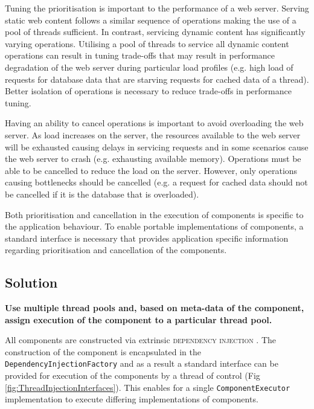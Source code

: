 \documentclass[prodmode]{style/acmlarge}
\begin{document}
Tuning the prioritisation is important to the performance of a web server.
Serving static web content follows a similar sequence of operations making the
use of a pool of threads sufficient.  In contrast, servicing dynamic content has
significantly varying operations.  Utilising a pool of threads to service all
dynamic content operations can result in tuning trade-offs that may result in
performance degradation of the web server during particular load profiles (e.g.
high load of requests for database data that are starving requests for cached
data of a thread).  Better isolation of operations is necessary to reduce
trade-offs in performance tuning.

Having an ability to cancel operations is important to avoid overloading the web
server.  As load increases on the server, the resources available to the web
server will be exhausted causing delays in servicing requests and in some
scenarios cause the web server to crash (e.g. exhausting available memory). 
Operations must be able to be cancelled to reduce the load on the server. 
However, only operations causing bottlenecks should be cancelled (e.g. a request
for cached data should not be cancelled if it is the database that is
overloaded).

Both prioritisation and cancellation in the execution of components is specific
to the application behaviour.  To enable portable implementations of components,
a standard interface is necessary that provides application specific information
regarding prioritisation and cancellation of the components.


\subsection{Solution}

\textbf{Use multiple thread pools and, based on meta-data of the component, assign execution of the component to a particular thread pool.}

All components are constructed via extrinsic \textsc{dependency injection}
\cite{ioc}.  The construction of the component is encapsulated in the
\texttt{DependencyInjectionFactory} and as a result a standard interface can be
provided for execution of the components by a thread of control (Fig
\ref{fig:ThreadInjectionInterfaces}).  This enables for a single
\texttt{ComponentExecutor} implementation to execute differing implementations
of components.
\end{document}
